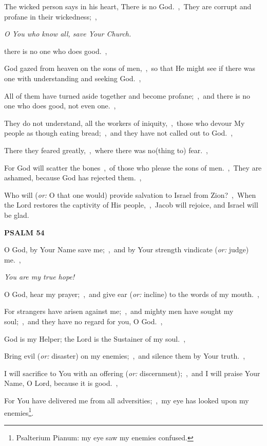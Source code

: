 \documentclass[12pt,twoside,a5paper]{article}
\newcommand{\psalm}[1]{\textbf{PSALM {#1}}\nopagebreak}
\newcommand{\qanona}[1]{{\liturgicalhint{Qanona.} \emph{#1}}}
\newcommand{\translationoption}[1]{\emph{or:} #1}
\begin{document}
\begin{normalparskip}
  The wicked person says in his heart, There is no God.~\sep\ They are corrupt and profane in their wickedness;~\sep

  \qanona{O You who know all, save Your Church.}

  there is no one who does good.~\sep

  God gazed from heaven on the sons of men,~\sep\ so that He might see if there was one with understanding and seeking God.~\sep

  All of them have turned aside together and become profane;~\sep\ and there is no one who does good, not even one.~\sep

  They do not understand, all the workers of iniquity,~\sep\ those who devour My people as though eating bread;~\sep\ and they have not called out to God.~\sep

  There they feared greatly,~\sep\ where there was no(thing to) fear.~\sep

  For God will scatter the bones~\sep\ of those who please the sons of men.~\sep\ They are ashamed, because God has rejected them.~\sep

  Who will (\translationoption{O that one would}) provide salvation to Israel from Zion?~\sep\ When the Lord restores the captivity of His people,~\sep\ Jacob will rejoice, and Israel will be glad.
\end{normalparskip}

\psalm{54}

\begin{normalparskip}
  O God, by Your Name save me;~\sep\ and by Your strength vindicate (\translationoption{judge}) me.~\sep

  \qanona{You are my true hope!}

  O God, hear my prayer;~\sep\ and give ear (\translationoption{incline}) to the words of my mouth.~\sep

  For strangers have arisen against me;~\sep\ and mighty men have sought my soul;~\sep\ and they have no regard for you, O God.~\sep

  God is my Helper; the Lord is the Sustainer of my soul.~\sep

  Bring evil (\translationoption{disaster}) on my enemies;~\sep\ and silence them by Your truth.~\sep

  I will sacrifice to You with an offering (\translationoption{discernment});~\sep\ and I will praise Your Name, O Lord, because it is good.~\sep

  For You have delivered me from all adversities;~\sep\ my eye has looked upon my enemies\footnote{Psalterium Pianum: my eye saw my enemies confused.}.
\end{normalparskip}
\end{document}
